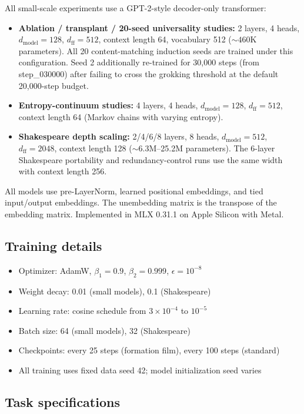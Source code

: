 \documentclass[final]{article}
\begin{document}
All small-scale experiments use a GPT-2-style decoder-only transformer:
\begin{itemize}
  \item \textbf{Ablation / transplant / 20-seed universality studies:}
        2 layers, 4 heads, $d_\text{model}=128$, $d_\text{ff}=512$,
        context length 64, vocabulary 512 (${\sim}460$K parameters). All
        20 content-matching induction seeds are trained under this
        configuration. Seed 2 additionally re-trained for 30{,}000 steps
        (from step\_030000) after failing to cross the grokking threshold
        at the default 20{,}000-step budget.
  \item \textbf{Entropy-continuum studies:} 4 layers, 4 heads, $d_\text{model}=128$,
        $d_\text{ff}=512$, context length 64 (Markov chains with varying entropy).
  \item \textbf{Shakespeare depth scaling:} 2/4/6/8 layers,
        8 heads, $d_\text{model}=512$, $d_\text{ff}=2048$, context length 128
        (${\sim}6.3$M--25.2M parameters). The 6-layer Shakespeare portability
        and redundancy-control runs use the same width with context length 256.
\end{itemize}

All models use pre-LayerNorm, learned positional embeddings, and tied
input/output embeddings. The unembedding matrix is the transpose of the
embedding matrix. Implemented in MLX 0.31.1 on Apple Silicon with Metal.

\subsection{Training details}

\begin{itemize}
  \item Optimizer: AdamW, $\beta_1=0.9$, $\beta_2=0.999$, $\epsilon=10^{-8}$
  \item Weight decay: 0.01 (small models), 0.1 (Shakespeare)
  \item Learning rate: cosine schedule from $3\times10^{-4}$ to $10^{-5}$
  \item Batch size: 64 (small models), 32 (Shakespeare)
  \item Checkpoints: every 25 steps (formation film), every 100 steps (standard)
  \item All training uses fixed data seed 42; model initialization seed varies
\end{itemize}

\subsection{Task specifications}
\end{document}
